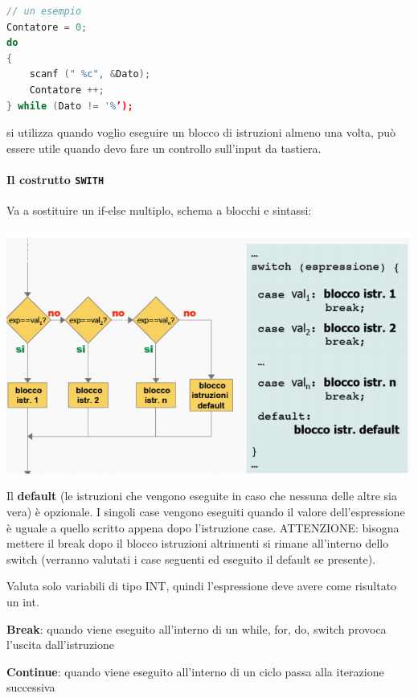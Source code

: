 \documentclass[
  paper=a4,
  oneside  ,captions=tableheading
]{scrbook}
\begin{document}
\begin{lstlisting}[language={C++}]
// un esempio
Contatore = 0;
do
{
    scanf (" %c", &Dato);
    Contatore ++;
} while (Dato != '%’);
\end{lstlisting}

si utilizza quando voglio eseguire un blocco di istruzioni almeno una
volta, può essere utile quando devo fare un controllo sull'input da
tastiera.

\hypertarget{il-costrutto-swith}{%
\paragraph{\texorpdfstring{Il costrutto
\texttt{SWITH}}{Il costrutto SWITH}}\label{il-costrutto-swith}}

Va a sostituire un if-else multiplo, schema a blocchi e sintassi:

\includegraphics{./image/image-20201207224317378.png}

Il \textbf{default} (le istruzioni che vengono eseguite in caso che
nessuna delle altre sia vera) è opzionale. I singoli case vengono
eseguiti quando il valore dell'espressione è uguale a quello scritto
appena dopo l'istruzione case. ATTENZIONE: bisogna mettere il break dopo
il blocco istruzioni altrimenti si rimane all'interno dello switch
(verranno valutati i case seguenti ed eseguito il default se presente).

Valuta solo variabili di tipo INT, quindi l'espressione deve avere come
risultato un int.

\textbf{Break}: quando viene eseguito all'interno di un while, for, do,
switch provoca l'uscita dall'istruzione

\textbf{Continue}: quando viene eseguito all'interno di un ciclo passa
alla iterazione successiva
\end{document}
